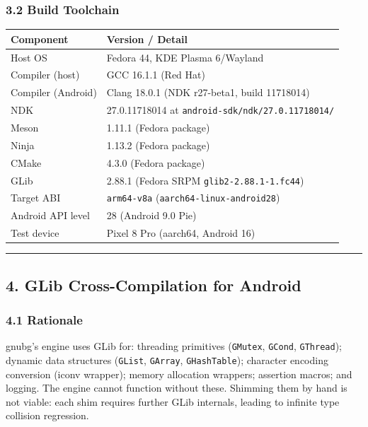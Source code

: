 \documentclass[11pt,a4paper]{article}
\begin{document}
\subsubsection{3.2 Build Toolchain}\label{build-toolchain}

\begin{longtable}[]{@{}ll@{}}
\toprule\noalign{}
Component & Version / Detail \\
\midrule\noalign{}
\endhead
\bottomrule\noalign{}
\endlastfoot
Host OS & Fedora 44, KDE Plasma 6/Wayland \\
Compiler (host) & GCC 16.1.1 (Red Hat) \\
Compiler (Android) & Clang 18.0.1 (NDK r27-beta1, build 11718014) \\
NDK & 27.0.11718014 at \texttt{android-sdk/ndk/27.0.11718014/} \\
Meson & 1.11.1 (Fedora package) \\
Ninja & 1.13.2 (Fedora package) \\
CMake & 4.3.0 (Fedora package) \\
GLib & 2.88.1 (Fedora SRPM \texttt{glib2-2.88.1-1.fc44}) \\
Target ABI & \texttt{arm64-v8a} (\texttt{aarch64-linux-android28}) \\
Android API level & 28 (Android 9.0 Pie) \\
Test device & Pixel 8 Pro (aarch64, Android 16) \\
\end{longtable}

\begin{center}\rule{0.5\linewidth}{0.5pt}\end{center}

\subsection{4. GLib Cross-Compilation for
Android}\label{glib-cross-compilation-for-android}

\subsubsection{4.1 Rationale}\label{rationale}

gnubg's engine uses GLib for: threading primitives (\texttt{GMutex},
\texttt{GCond}, \texttt{GThread}); dynamic data structures
(\texttt{GList}, \texttt{GArray}, \texttt{GHashTable}); character
encoding conversion (iconv wrapper); memory allocation wrappers;
assertion macros; and logging. The engine cannot function without these.
Shimming them by hand is not viable: each shim requires further GLib
internals, leading to infinite type collision regression.
\end{document}
